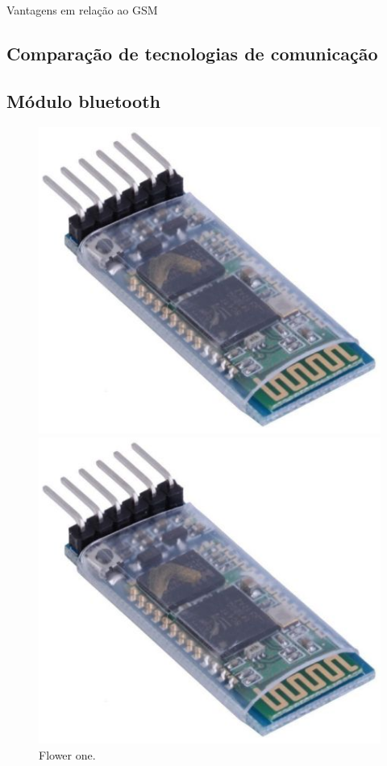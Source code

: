 Vantagens em relação ao GSM


\subsection{Comparação de tecnologias de comunicação}





\subsection{Módulo bluetooth}


\begin{figure}[h]
	\centering
	\begin{minipage}[b]{0.4\textwidth}
		\includegraphics[width=\textwidth]{img/hardware/bluetooth_zs-040.png}
		\caption{Flower one.}
	\end{minipage}
	\hfill
	\begin{minipage}[b]{0.4\textwidth}
		\includegraphics[width=\textwidth]{img/hardware/bluetooth_zs-040.png}

\end{minipage}
\end{figure}
